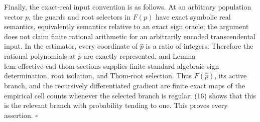 Finally, the exact-real input convention is as follows.  At an arbitrary population vector \(p\), the guards and root selectors in \(F(p)\) have exact symbolic real semantics, equivalently semantics relative to an exact sign oracle; the argument does not claim finite rational arithmetic for an arbitrarily encoded transcendental input.  In the estimator, every coordinate of \(\widehat p\) is a ratio of integers.  Therefore the rational polynomials at \(\widehat p\) are exactly represented, and Lemma \(\mathrm{lem:effective\text{-}cad\text{-}thom\text{-}sections}\) supplies finite standard algebraic sign determination, root isolation, and Thom-root selection.  Thus \(F(\widehat p)\), its active branch, and the recursively differentiated gradient are finite exact maps of the empirical cell counts whenever the selected branch is regular; (16) shows that this is the relevant branch with probability tending to one.  This proves every assertion. \(\square\)